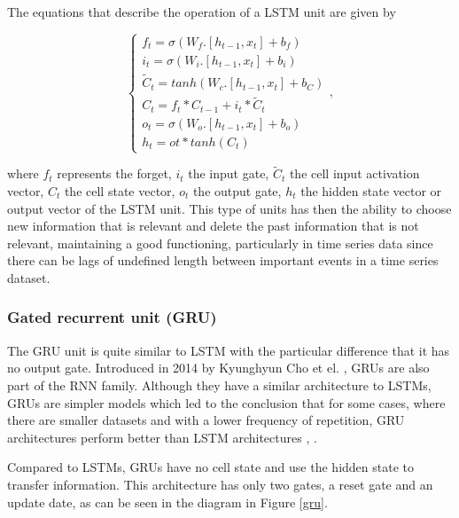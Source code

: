 The equations that describe the operation of a \ac{LSTM} unit are given by 

\begin{equation}
    \begin{cases} 
        
        f_t=\sigma(W_f.[h_{t-1},x_t] + b_f)\\
        i_t=\sigma(W_i.[h_{t-1},x_t] + b_i)\\
        \widetilde{C}_t = tanh(W_c.[h_{t-1},x_t] + b_C)\\
        C_t=f_t*C_{t-1}+i_t* \widetilde{C}_t\\
        o_t=\sigma(W_o.[h_{t-1},x_t] + b_o)\\
        h_t=ot*tanh(C_t)
        
         
    \end{cases} ,
\end{equation}

where $f_t$ represents the forget, $i_t$ the input gate, $\widetilde{C}_t$ the cell input activation vector, ${C}_t$ the cell state vector, $o_t$ the output gate, $h_t$ the hidden state vector or output vector of the \ac{LSTM} unit. This type of units has then the ability to choose new information that is relevant and delete the past information that is not relevant, maintaining a good functioning, particularly in time series data since there can be lags of undefined length between important events in a time series dataset.

\subsubsection{Gated recurrent unit (GRU)}\label{chap3:subsubsec:gru}

The \ac{GRU} unit is quite similar to \ac{LSTM} with the particular difference that it has no output gate. Introduced in 2014 by Kyunghyun Cho et el. \cite{gru0}, \ac{GRU}s are also part of the \ac{RNN} family. Although they have a similar architecture to \ac{LSTM}s, \ac{GRU}s are simpler models which led to the conclusion that for some cases, where there are smaller datasets and with a lower frequency of repetition, \ac{GRU} architectures perform better than \ac{LSTM} architectures \cite{gru1}, \cite{gru2}.

Compared to \ac{LSTM}s, \ac{GRU}s have no cell state and use the hidden state to transfer information. This architecture has only two gates, a reset gate and an update date, as can be seen in the diagram in Figure \ref{gru}.

